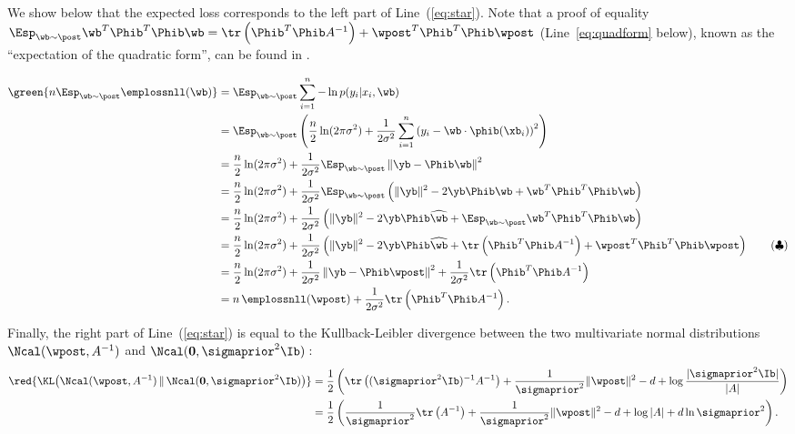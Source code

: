 \documentclass{article}
\theoremstyle{definition}
\theoremstyle{plain}
\newcommand{\citetA}{\citet}
\begin{document}
We show below that the expected loss \green{$\Esp_{\wb\sim\post^*}\emplossnll(\wb)$} corresponds to the left part of Line~(\ref*{eq:star}). Note that a proof of equality 
$ \Esp_{\wb \sim  \post}   \wb^T \Phib^T  \Phib \wb = \tr \left( \Phib^T \Phib A^{-1} \right) + \wpost^T \Phib^T  \Phib \wpost $ (Line~\ref*{eq:quadform} below),
known as the ``expectation of the quadratic form'',
can be found in \citetA[Theorem 1.5]{seber-03}.

{\allowdisplaybreaks[4]
	\begin{align*}
%
\green{n \Esp_{\wb\sim\post} \emplossnll(\wb) }
&= \Esp_{\wb \sim \post} \sum_{i=1}^n -\ln p(y_i|x_i,\wb) \\
& = \Esp_{\wb \sim \post} \left( \frac{n}{2} \ln(2 \pi \sigma^2 ) +  \frac{1}{2 \sigma^2} \sum_{i=1}^n \left(y_i -  \wb \cdot \phib(\xb_i) \right)^2 \right) \\
& =   \frac{n}{2} \ln(2 \pi \sigma^2 ) +   \frac{1}{2 \sigma^2} \Esp_{\wb \sim \post}\left\Vert \yb -  \Phib \wb  \right\Vert ^2  \\
& = \frac{n}{2} \ln(2 \pi \sigma^2 ) +    \frac{1}{2 \sigma^2}\Esp_{\wb \sim \post}\left ( \Vert \yb \Vert^2  - 2 \yb  \Phib \wb +  \wb^T \Phib^T  \Phib \wb  \right) \\
& = \frac{n}{2} \ln(2 \pi \sigma^2 ) +   \frac{1}{2 \sigma^2}\left( \Vert \yb \Vert^2  - 2 \yb  \Phib \widehat{\wb} + \Esp_{\wb \sim  \post}   \wb^T \Phib^T  \Phib \wb  \right) \\
& = \frac{n}{2} \ln(2 \pi \sigma^2 ) +    \frac{1}{2 \sigma^2} \left( \Vert \yb \Vert^2  - 2 \yb  \Phib \widehat{\wb} + \tr \left( \Phib^T \Phib A^{-1} \right) + \wpost^T \Phib^T  \Phib \wpost \right) \tag{$\clubsuit$} \label{eq:quadform} \\
& = \frac{n}{2} \ln(2 \pi \sigma^2 ) +    \frac{1}{2 \sigma^2} \left\Vert \yb -  \Phib \wpost  \right\Vert ^2 +    \frac{1}{2 \sigma^2}  \tr \left( \Phib^T \Phib A^{-1} \right)\\
& = n\,\emplossnll(\wpost) +    \frac{1}{2 \sigma^2}  \tr \left( \Phib^T \Phib A^{-1}\right).
\end{align*}
}

Finally, the right part of Line~(\ref*{eq:star}) is equal to the Kullback-Leibler divergence between the two multivariate normal distributions
$\Ncal(\wpost,A^{-1})$ and $\Ncal(\mathbf{0},\sigmaprior^2\Ib)$\,:
\begin{align*}
\red{\KL\big(\Ncal(\wpost,A^{-1})\,\|\,\Ncal(\mathbf{0},\sigmaprior^2\Ib)\big)}
&= \frac12\left(
\tr\left((\sigmaprior^2\Ib)^{-1}A^{-1}\right)
+ 				\frac1{\sigmaprior^2}\|\wpost\|^2
- d
+  \log\frac{|\sigmaprior^2\Ib|}{|A|}
%
\right)\\
&= \frac12\left(
\frac1{\sigmaprior^2}\tr\left(A^{-1}\right)
+ 				\frac1{\sigmaprior^2}\|\wpost\|^2
- d
+  \log{|A|}
+d\ln\sigmaprior^2 
\right).
\end{align*}		
\end{document}

